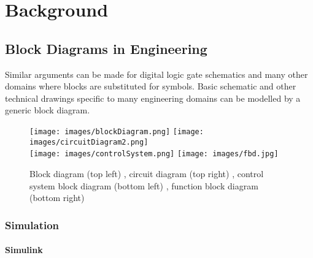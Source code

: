 \begin{comment}

\end{comment}


\chapter{Background}

\section{Block Diagrams in Engineering}




Similar arguments can be made for digital logic gate schematics and many other domains where blocks are substituted for symbols. Basic schematic and other technical drawings specific to many engineering domains can be modelled by a generic block diagram.

\begin{figure}[ht!]
\texttt{[image: images/blockDiagram.png]}
\hspace{0.5 cm}
\texttt{[image: images/circuitDiagram2.png]} \\
\texttt{[image: images/controlSystem.png]} 
\hspace{0.5 cm}
\texttt{[image: images/fbd.jpg]} 
\centering
\caption{Block diagram (top left) \cite{wiringDiagrams}, circuit diagram (top right) \cite{engineeronadisk}, control system block diagram (bottom left) \cite{engineeronadisk}, function block diagram (bottom right) \cite{wikicommonsFbd}}
\label{im:blockExample}
\end{figure}


\subsection{Simulation}

\subsubsection{Simulink}

